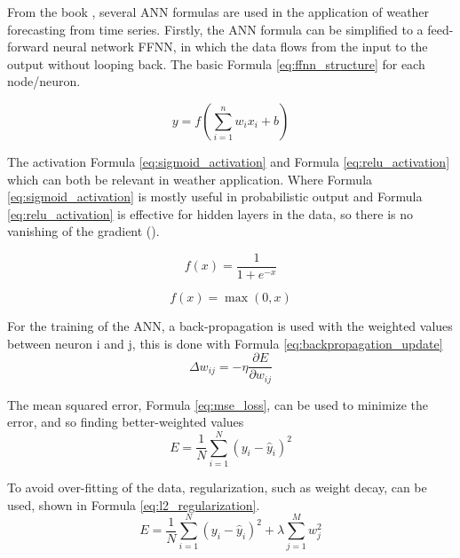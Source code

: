 \noindent From the book \cite{haykin1994neural}, several ANN formulas are used in the application of weather forecasting from time series. Firstly, the ANN formula can be simplified to a feed-forward neural network FFNN, in which the data flows from the input to the output without looping back. The basic Formula \ref{eq:ffnn_structure} for each node/neuron.

\begin{equation}
    y = f\left(\sum_{i=1}^n w_i x_i + b\right)
    \label{eq:ffnn_structure}
\end{equation}

\noindent The activation Formula \ref{eq:sigmoid_activation} and Formula \ref{eq:relu_activation} which can both be relevant in weather application. Where Formula \ref{eq:sigmoid_activation} is mostly useful in probabilistic output and Formula \ref{eq:relu_activation} is effective for hidden layers in the data, so there is no vanishing of the gradient (\cite{haykin1994neural}).

\begin{equation}
    f(x) = \frac{1}{1 + e^{-x}}
    \label{eq:sigmoid_activation}
\end{equation}

\begin{equation}
    f(x) = \max(0, x)
    \label{eq:relu_activation}
\end{equation}

\noindent For the training of the ANN, a back-propagation is used with the weighted values between neuron i and j, this is done with Formula \ref{eq:backpropagation_update}
\begin{equation}
    \Delta w_{ij} = -\eta \frac{\partial E}{\partial w_{ij}}
    \label{eq:backpropagation_update}
\end{equation}

\noindent The mean squared error, Formula \ref{eq:mse_loss}, can be used to minimize the error, and so finding better-weighted values
\begin{equation}
    E = \frac{1}{N} \sum_{i=1}^{N} (y_i - \hat{y}_i)^2
    \label{eq:mse_loss}
\end{equation}

\noindent To avoid over-fitting of the data, regularization, such as weight decay, can be used, shown in Formula \ref{eq:l2_regularization}.  
\begin{equation}
    E = \frac{1}{N} \sum_{i=1}^{N} (y_i - \hat{y}_i)^2 + \lambda \sum_{j=1}^{M} w_j^2
    \label{eq:l2_regularization}
\end{equation}

